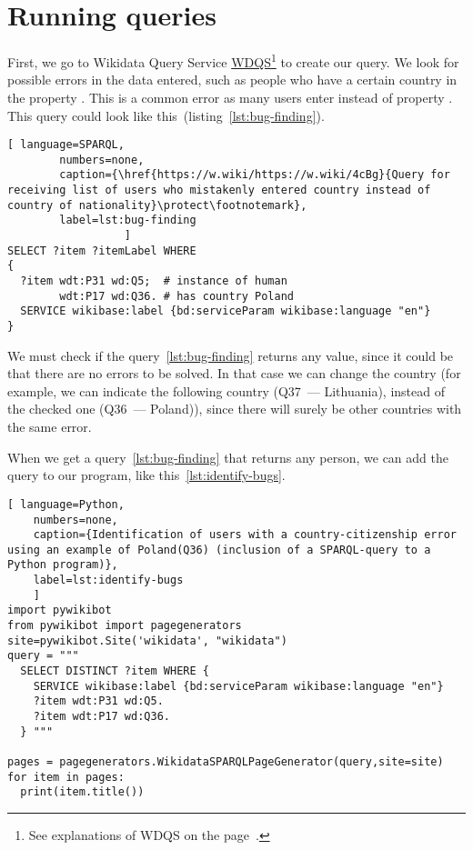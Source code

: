 \section{Running queries}
\label{sec:running queries eng}

First, we go to Wikidata Query Service \href{https://query.wikidata.org/}{WDQS}\footnote{%
See explanations of WDQS on the page~\pageref{sect:WDQS}.%
}%
 to create our query. 
We look for possible errors in the data entered, such as people who have a certain country in the property .
This is a common error as many users enter  instead of property .
This query could look like this~(listing~\ref{lst:bug-finding}).

\begin{lstlisting}[ language=SPARQL,
        numbers=none,
        caption={\href{https://w.wiki/https://w.wiki/4cBg}{Query for receiving list of users who mistakenly entered country instead of country of nationality}\protect\footnotemark},
        label=lst:bug-finding
                  ]
SELECT ?item ?itemLabel WHERE 
{
  ?item wdt:P31 wd:Q5;  # instance of human
        wdt:P17 wd:Q36. # has country Poland
  SERVICE wikibase:label {bd:serviceParam wikibase:language "en"}
}
\end{lstlisting}

We must check if the query~\ref{lst:bug-finding} returns any value,
since it could be that there are no errors to be solved. 
In that case we can change the country 
(for example, we can indicate the following country (Q37~--- Lithuania), instead of the checked one (Q36~--- Poland)), 
since there will surely be other countries with the same error.

When we get a query~\ref{lst:bug-finding} that returns any person, 
we can add the query to our program, like this~\ref{lst:identify-bugs}.

\begin{lstlisting}[ language=Python,
    numbers=none,
    caption={Identification of users with a country-citizenship error using an example of Poland(Q36) (inclusion of a SPARQL-query to a Python program)},
    label=lst:identify-bugs
    ]
import pywikibot
from pywikibot import pagegenerators
site=pywikibot.Site('wikidata', "wikidata")
query = """
  SELECT DISTINCT ?item WHERE {
    SERVICE wikibase:label {bd:serviceParam wikibase:language "en"}
    ?item wdt:P31 wd:Q5.
    ?item wdt:P17 wd:Q36.
  } """

pages = pagegenerators.WikidataSPARQLPageGenerator(query,site=site)
for item in pages:
  print(item.title())
\end{lstlisting}    

